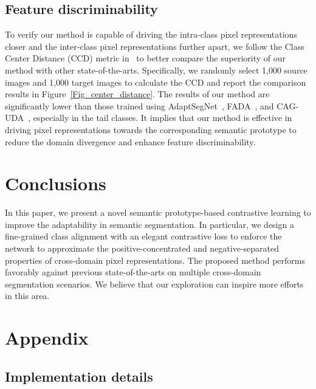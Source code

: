 \documentclass[runningheads]{llncs}
\begin{document}
\subsection{Feature discriminability}
To verify our method is capable of driving the intra-class pixel representations closer and the inter-class pixel representations further apart, we follow the Class Center Distance (CCD) metric in~\cite{wang2020class} to better compare the superiority of our method with other state-of-the-arts. Specifically, we randomly select 1,000 source images and 1,000 target images to calculate the CCD and report the comparison results in Figure~\ref{Fig_center_distance}. The results of our method are significantly lower than those trained using AdaptSegNet~\cite{tsai2018learning}, FADA~\cite{wang2020class}, and CAG-UDA~\cite{zhang2019category}, especially in the tail classes. It implies that our method is effective in driving pixel representations towards the corresponding semantic prototype to reduce the domain divergence and enhance feature discriminability.


\section{Conclusions}
In this paper, we present a novel semantic prototype-based contrastive learning to improve the adaptability in semantic segmentation. In particular, we design a fine-grained class alignment with an elegant contrastive loss to enforce the network to approximate the positive-concentrated and negative-separated properties of cross-domain pixel representations. 
The proposed method performs favorably against previous state-of-the-arts on multiple cross-domain segmentation scenarios. We believe that our exploration can inspire more efforts in this area.





\clearpage


\section*{Appendix}
\renewcommand{\thesubsection}{\Alph{subsection}}

\subsection{Implementation details}
\label{appendix:implementation}
\end{document}
